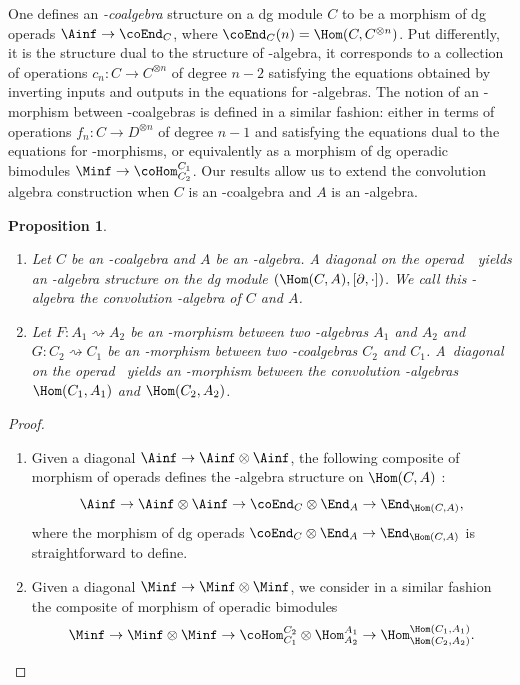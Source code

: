 \documentclass[JEP,XML,SOM,NoFloatCountersInSection,Unicode,published]{cedram}
\theoremstyle{definition}
\theoremstyle{plain}
\newtheorem{proposition}[definition]{Proposition}
\begin{document}
One defines an \textit{\Ainf -coalgebra} structure on a dg module $C$ to be a morphism of dg operads $\Ainf \to \coEnd_C$, where $\coEnd_C(n) = \Hom (C, C^{\otimes n})$.
Put differently, it is the structure dual to the structure of \Ainf -algebra, \ie it corresponds to a collection of operations $c_n : C \to C^{\otimes n}$ of degree $n-2$ satisfying the equations obtained by inverting inputs and outputs in the equations for \Ainf -algebras.
The notion of an \Ainf -morphism between \Ainf -coalgebras is defined in a similar fashion: either in terms of operations $f_n : C \to D^{\otimes n}$ of degree $n-1$ and satisfying the equations dual to the equations for \Ainf -morphisms, or equivalently as a morphism of dg operadic bimodules $\Minf \to \coHom^{C_1}_{C_2}$.
Our results allow us to extend the convolution algebra construction when $C$ is an \Ainf -coalgebra and $A$ is an \Ainf -algebra.

\skpt
\begin{proposition}
\label{prop:convolution-ainf}
\begin{enumerate}
\item\label{prop:convolution-ainf1}
Let $C$ be an \Ainf -coalgebra and $A$ be an \Ainf -algebra.
A diagonal on the ope\-rad~\Ainf\ yields an \Ainf -algebra structure on the dg module $(\Hom (C,A), [\partial,\cdot])$.
We call this \Ainf\nobreakdash-alge\-bra the \emph{convolution \Ainf -algebra of $C$ and $A$}.
\item\label{prop:convolution-ainf2}
Let $F : A_1 \rightsquigarrow A_2$ be an \Ainf -morphism between two \Ainf -algebras $A_1$ and $A_2$ and $G : C_2 \rightsquigarrow C_1$ be an \Ainf -morphism between two \Ainf -coalgebras $C_2$ and $C_1$. A~diagonal on the operad \Minf\ yields an \Ainf -morphism between the convolution \Ainf\nobreakdash-alge\-bras $\Hom (C_1,A_1)$ and $\Hom (C_2,A_2)$.
\end{enumerate}
\end{proposition}

\skpt
\begin{proof}
\begin{enumerate}
\item Given a diagonal $\Ainf \to \Ainf \otimes \Ainf$, the following composite of morphism of operads defines the \Ainf -algebra structure on $\Hom(C,A)$ :
\[
\Ainf \to \Ainf \otimes \Ainf \to \coEnd_C\otimes \End_A \to \End_{\Hom(C,A)},
\]
where the morphism of dg operads $\coEnd_C \otimes \End_A \to \End_{\Hom(C,A)}$ is straightforward to define.
\item Given a diagonal $\Minf \to \Minf \otimes \Minf$, we consider in a similar fashion the composite of morphism of operadic bimodules
\[
\Minf \to \Minf \otimes \Minf \to \coHom^{C_2}_{C_1} \otimes \Hom^{A_1}_{A_2} \to \Hom^{\Hom(C_1,A_1)}_{\Hom(C_2, A_2)}.\qedhere
\]
\end{enumerate}
\end{proof}
\end{document}
